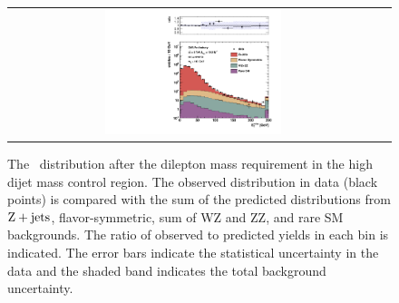 \begin{table}[htb]
\begin{center}
\begin{tabular}{l|c|c|c|c}

\end{tabular}
\end{center}
\end{table}

\clearpage

\begin{figure}[!h]
\begin{center}
\begin{tabular}{cc}
\includegraphics[width=0.49\textwidth]{plots/met_metall.pdf}
\end{tabular}
\caption{The \MET\ distribution after the dilepton mass requirement in the high dijet mass control region. The observed distribution in data
(black points) is compared with the sum of the predicted distributions from $\rm{Z}+\rm{jets}$, flavor-symmetric, sum of WZ and ZZ, and rare SM backgrounds. 
The ratio of observed to predicted yields in each bin is
indicated. The error bars indicate the statistical uncertainty in the data and the shaded band indicates the total background uncertainty.
\label{fig:results_targ_control}
}
\end{center}
\end{figure}

